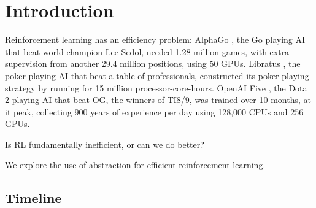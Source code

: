 \chapter{Introduction}\label{C:intro}

Reinforcement learning has an efficiency problem: AlphaGo \cite{Silver2016a}, the Go
playing AI that beat world champion Lee Sedol, needed 1.28 million games, with
extra supervision from another 29.4 million positions, using 50 GPUs.
Libratus \cite{Brown2018b}, the poker playing AI that beat a table of professionals,
constructed its poker-playing strategy by running for 15 million processor-core-hours.
OpenAI Five \cite{Berner2019}, the Dota 2 playing AI that beat OG, the winners of TI8/9, was
trained over 10 months, at it peak, collecting 900 years of experience per day using
128,000 CPUs and 256 GPUs.

Is RL fundamentally inefficient, or can we do better?

We explore the use of abstraction for efficient reinforcement learning.





%

\section{Timeline}

